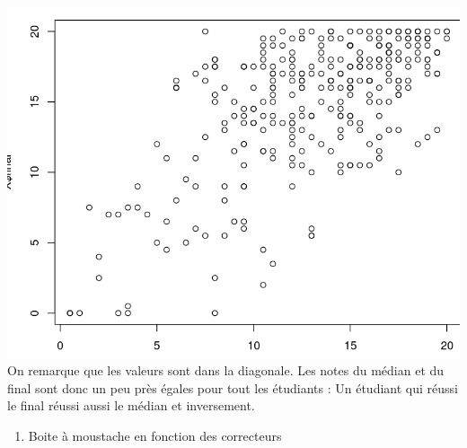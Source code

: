 \documentclass[
]{article}
\newenvironment{Shaded}{}{}
\newcommand{\CommentTok}[1]{\textcolor[rgb]{0.38,0.63,0.69}{\textit{#1}}}
\newcommand{\KeywordTok}[1]{\textcolor[rgb]{0.00,0.44,0.13}{\textbf{#1}}}
\newcommand{\NormalTok}[1]{#1}
\newcommand{\OperatorTok}[1]{\textcolor[rgb]{0.40,0.40,0.40}{#1}}
\newcommand{\StringTok}[1]{\textcolor[rgb]{0.25,0.44,0.63}{#1}}
\providecommand{\tightlist}{%
  \setlength{\itemsep}{0pt}\setlength{\parskip}{0pt}}
\begin{document}
\begin{Shaded}
\end{Shaded}

\includegraphics{img/plot.png} On remarque que les valeurs sont dans la
diagonale. Les notes du médian et du final sont donc un peu près égales
pour tout les étudiants : Un étudiant qui réussi le final réussi aussi
le médian et inversement.

\begin{enumerate}
\def\labelenumi{\arabic{enumi}.}
\setcounter{enumi}{29}
\tightlist
\item
  Boite à moustache en fonction des correcteurs
\end{enumerate}

\begin{Shaded}
\end{Shaded}
\end{document}
